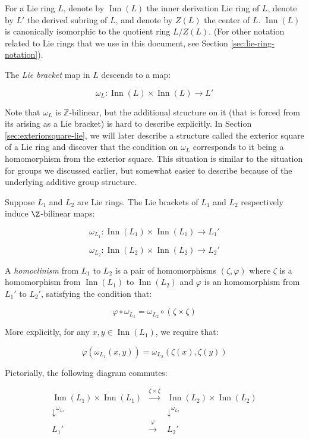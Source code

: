 \documentclass{ucetd}
\begin{document}
For a Lie ring $L$, denote by $\operatorname{Inn}(L)$ the inner
derivation Lie ring of $L$, denote by $L'$ the derived subring of $L$,
and denote by $Z(L)$ the center of $L$. $\operatorname{Inn}(L)$ is
canonically isomorphic to the quotient ring $L/Z(L)$. (For other
notation related to Lie rings that we use in this document, see
Section \ref{sec:lie-ring-notation}).

The {\em Lie bracket} map in $L$ descends to a map:

$$\omega_L: \operatorname{Inn}(L) \times \operatorname{Inn}(L) \to L'$$

Note that $\omega_L$ is $\mathbb{Z}$-bilinear, but the additional
structure on it (that is forced from its arising as a Lie bracket) is
hard to describe explicitly. In Section \ref{sec:exteriorsquare-lie}, we
will later describe a structure called the exterior square of a Lie
ring and discover that the condition on $\omega_L$ corresponds to
it being a homomorphism from the exterior square. This situation is
similar to the situation for groups we discussed earlier, but somewhat
easier to describe because of the underlying additive group structure.

Suppose $L_1$ and $L_2$ are Lie rings. The Lie brackets of $L_1$ and
$L_2$ respectively induce $\Z$-bilinear maps:

$$\omega_{L_1}: \operatorname{Inn}(L_1) \times \operatorname{Inn}(L_1) \to L_1'$$

$$\omega_{L_2}: \operatorname{Inn}(L_2) \times \operatorname{Inn}(L_2) \to L_2'$$

A {\em homoclinism} from $L_1$ to $L_2$ is a pair of homomorphisms
$(\zeta,\varphi)$ where $\zeta$ is a homomorphism from
$\operatorname{Inn}(L_1)$ to $\operatorname{Inn}(L_2)$ and $\varphi$ is an
homomorphism from $L_1'$ to $L_2'$, satisfying the condition that:

$$\varphi \circ \omega_{L_1} = \omega_{L_2} \circ (\zeta \times \zeta)$$

More explicitly, for any $x,y \in \operatorname{Inn}(L_1)$, we require that:

$$\varphi(\omega_{L_1}(x,y)) = \omega_{L_2}(\zeta(x),\zeta(y))$$

Pictorially, the following diagram commutes:

$$\begin{array}{ccc}
  \operatorname{Inn}(L_1) \times \operatorname{Inn}(L_1) & \stackrel{\zeta \times \zeta}{\to} & \operatorname{Inn}(L_2) \times \operatorname{Inn}(L_2) \\
  \downarrow^{\omega_{L_1}}  & & \downarrow^{\omega_{L_2}}\\
  L_1' & \stackrel{\varphi}{\to} & L_2'\\
\end{array}$$
\end{document}
